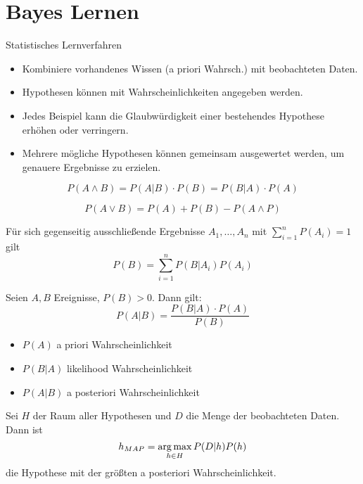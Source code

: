 \chapter{Bayes Lernen}
Statistisches Lernverfahren
\begin{itemize}
    \item Kombiniere vorhandenes Wissen (a priori Wahrsch.) mit beobachteten
    Daten.
    \item Hypothesen können mit Wahrscheinlichkeiten angegeben werden.
    \item Jedes Beispiel kann die Glaubwürdigkeit einer bestehendes Hypothese
    erhöhen oder verringern.
    \item  Mehrere mögliche Hypothesen können gemeinsam ausgewertet werden, um
    genauere Ergebnisse zu erzielen.
\end{itemize}

\begin{displaymath}
    P(A \land B) = P(A|B) \cdot P(B) = P(B|A) \cdot P(A)
\end{displaymath}

\begin{displaymath}
    P(A \lor B) = P(A) + P(B) - P(A \land P)
\end{displaymath}

Für sich gegenseitig ausschließende Ergebnisse $A_1,\dots,A_n$ mit
$\sum_{i=1}^n P(A_i) = 1$ gilt
\begin{displaymath}
    P(B) = \sum_{i=1}^n P(B|A_i) P(A_i)
\end{displaymath}

    Seien $A, B$ Ereignisse, $P(B) > 0$. Dann gilt:
\begin{displaymath}
P(A|B) = \frac{P(B|A) \cdot P(A)}{P(B)}
\end{displaymath}
\begin{itemize}
    \item $P(A)$ a priori Wahrscheinlichkeit
    \item $P(B|A)$ likelihood Wahrscheinlichkeit
    \item $P(A|B)$ a posteriori Wahrscheinlichkeit
\end{itemize}

Sei $H$ der Raum aller Hypothesen und $D$ die Menge der beobachteten Daten. Dann
ist
\begin{displaymath}
    h_{MAP} = \operatorname*{arg\,max}_{h \in H} P(D|h)P(h)
\end{displaymath}
die Hypothese mit der größten a posteriori Wahrscheinlichkeit.\\

